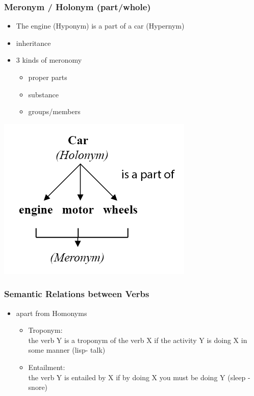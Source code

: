 \begin{frame}
\frametitle{Meronym / Holonym (part/whole)}
\begin{minipage}{0.5\textwidth}
\begin{itemize}
\item The engine (Hyponym) is a part of a car (Hypernym)
\item inheritance
\item 3 kinds of meronomy
\begin{itemize}
\item proper parts
\item substance
\item groups/members
\end{itemize}
\end{itemize}
\end{minipage}
\begin{minipage}{0.4\textwidth}
\includegraphics[scale=0.33]{img/wordnet_mer.png}
\end{minipage}
\end{frame}

\begin{frame}
\frametitle{Semantic Relations between Verbs}
\begin{itemize}
\item apart from Homonyms
\begin{itemize}
\item Troponym:\\
the verb Y is a troponym of the verb X if the activity Y is doing X in some manner (lisp- talk)
\item Entailment:\\
the verb Y is entailed by X if by doing X you must be doing Y (sleep - snore)
\end{itemize}
\end{itemize}
\end{frame}

